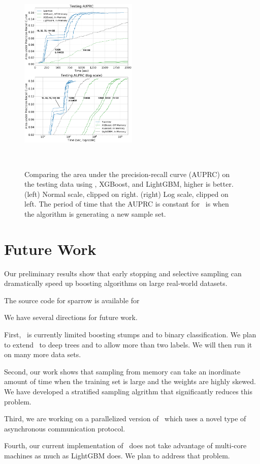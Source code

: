 \begin{figure}[t]
    \centering
    \includegraphics[width=0.5\textwidth]{figs/splice-auprc2m.png}
    \caption{Comparing the area under the precision-recall curve (AUPRC) on the testing data
    using \Sparrow, XGBoost, and LightGBM, higher is better.
    (left) Normal scale, clipped on right.
    (right) Log scale, clipped on left.
    The period of time that the AUPRC is constant for \Sparrow\ is when the algorithm is generating a new sample set.}~\label{fig:auprc}
\end{figure}


\section{Future Work}\label{sec:Conclusion}
Our preliminary results show that early stopping and selective
sampling can dramatically speed up boosting algorithms on large
real-world datasets.

The source code for sparrow is available for {\tt }

We have several directions for future work.

First, \Sparrow\ is currently limited boosting stumps and to binary
classification. We plan to extend \Sparrow\ to deep trees and to allow
more than two labels. We will then run it on many more data sets.

Second, our work shows that sampling from memory can take an
inordinate amount of time when the training set is large and the
weights are highly skewed. We have developed a stratified sampling
algrithm that significantly reduces this problem.

Third, we are working on a parallelized version of \Sparrow\ which
uses a  novel type of asynchronous communication protocol.

Fourth, our current implementation of \Sparrow\ does not take
advantage of multi-core machines as much as LightGBM does. We plan to
address that problem.




